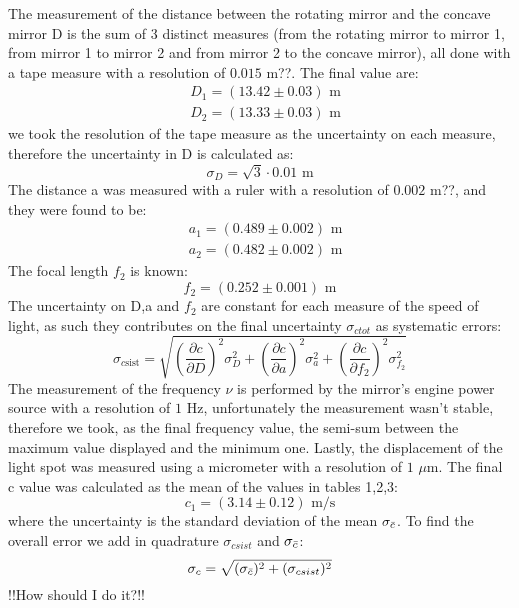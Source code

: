 The measurement of the distance between the rotating mirror and the concave mirror D is the sum of 3 distinct measures (from the rotating mirror to mirror 1, from mirror 1 to mirror 2 and from mirror 2 to the concave mirror), all done with a tape measure with a resolution of $0.015$ m??. The final value are:
\begin{align*}
    &D_1=(13.42\pm0.03)\,\,\text{m}\\
    &D_2=(13.33\pm0.03)\,\,\text{m}
\end{align*}
we took the resolution of the tape measure as the uncertainty on each measure, therefore the uncertainty in D is calculated as:
\begin{equation*}
    \sigma_D=\sqrt{3}\cdot 0.01\,\, \text{m}
\end{equation*}
The distance a was measured with a ruler with a resolution of $0.002$ m??, and they were found to be:
\begin{align*}
    &a_1=(0.489\pm0.002)\,\, \text{m}\\
    &a_2=(0.482\pm0.002)\,\, \text{m}
\end{align*}
The focal length $f_2$ is known:
\begin{equation*}
    f_2=(0.252\pm0.001)\,\, \text{m}
\end{equation*}
The uncertainty on D,a and $f_2$ are constant for each measure of the speed of light, as such they contributes on the final uncertainty $\sigma_{ctot}$ as systematic errors:
\begin{equation*}
    \sigma_{c\text{sist}} = \sqrt{\left(\frac{\partial c}{\partial D}\right)^2 \sigma_D^2 + \left(\frac{\partial c}{\partial a}\right)^2 \sigma_a^2 + \left(\frac{\partial c}{\partial f_2}\right)^2 \sigma_{f_2}^2}
\end{equation*}
The measurement of the frequency $\nu$ is performed by the mirror's engine power source with a resolution of $1 \,\, \text{Hz}$, unfortunately the measurement wasn't stable, therefore we took, as the final frequency value, the semi-sum between the maximum value displayed and the minimum one. Lastly, the displacement of the light spot was measured using a micrometer with a resolution of $1\,\,\mu\text{m}$.
The final c value was calculated as the mean of the values in tables 1,2,3:
\begin{equation*}
    c_1=(3.14\pm0.12)\,\,\text{m/s}
\end{equation*}
where the uncertainty is the standard deviation of the mean $\sigma_{\Bar{c}}$. To find the overall error we add in quadrature $\sigma_{csist}$ and $\sigma_{\Bar{c}}$:
\begin{equation*}
    \sigma_c=\sqrt{(\sigma_{\Bar{c}})^2+(\sigma_{csist})^2}
\end{equation*}
!!How should I do it?!!
